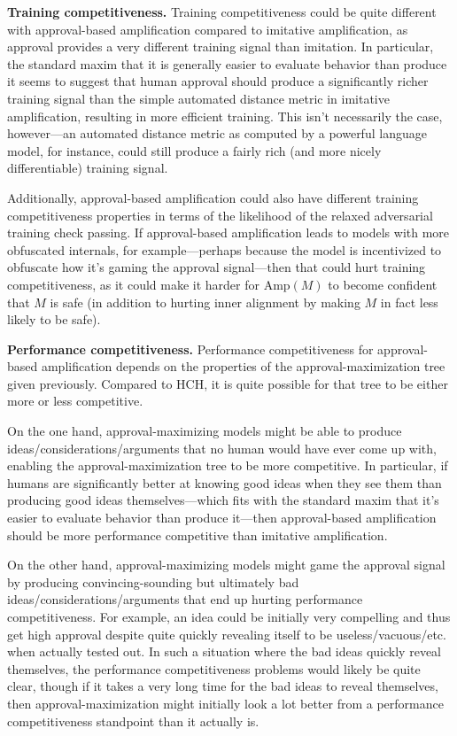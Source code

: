 \textbf{Training competitiveness.} Training competitiveness could be quite different with approval-based amplification compared to imitative amplification, as approval provides a very different training signal than imitation. In particular, the standard maxim that it is generally easier to evaluate behavior than produce it seems to suggest that human approval should produce a significantly richer training signal than the simple automated distance metric in imitative amplification, resulting in more efficient training. This isn't necessarily the case, however---an automated distance metric as computed by a powerful language model, for instance, could still produce a fairly rich (and more nicely differentiable) training signal.

Additionally, approval-based amplification could also have different training competitiveness properties in terms of the likelihood of the relaxed adversarial training check passing. If approval-based amplification leads to models with more obfuscated internals, for example---perhaps because the model is incentivized to obfuscate how it's gaming the approval signal---then that could hurt training competitiveness, as it could make it harder for $\text{Amp}(M)$ to become confident that $M$ is safe (in addition to hurting inner alignment by making $M$ in fact less likely to be safe).

\textbf{Performance competitiveness.} Performance competitiveness for approval-based amplification depends on the properties of the approval-maximization tree given previously. Compared to HCH, it is quite possible for that tree to be either more or less competitive.

On the one hand, approval-maximizing models might be able to produce ideas/considerations/arguments that no human would have ever come up with, enabling the approval-maximization tree to be more competitive. In particular, if humans are significantly better at knowing good ideas when they see them than producing good ideas themselves---which fits with the standard maxim that it's easier to evaluate behavior than produce it---then approval-based amplification should be more performance competitive than imitative amplification.

On the other hand, approval-maximizing models might game the approval signal by producing convincing-sounding but ultimately bad ideas/considerations/arguments that end up hurting performance competitiveness. For example, an idea could be initially very compelling and thus get high approval despite quite quickly revealing itself to be useless/vacuous/etc. when actually tested out. In such a situation where the bad ideas quickly reveal themselves, the performance competitiveness problems would likely be quite clear, though if it takes a very long time for the bad ideas to reveal themselves, then approval-maximization might initially look a lot better from a performance competitiveness standpoint than it actually is.

